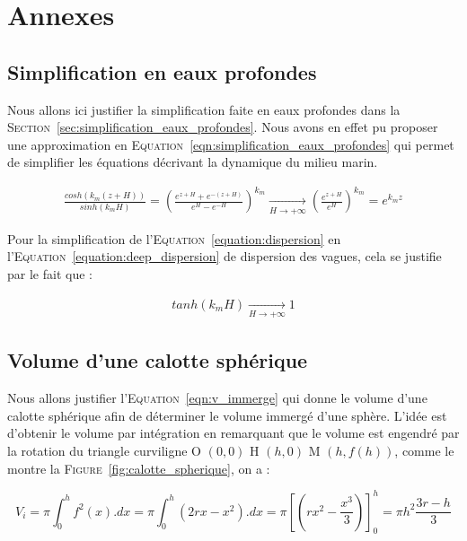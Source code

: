 \chapter{Annexes}
\label{annexe:gantt}

	\section{Simplification en eaux profondes}
	\label{annexe:deep_water}

		Nous allons ici justifier la simplification faite en eaux profondes dans la \textsc{Section}~\ref{sec:simplification_eaux_profondes}. Nous avons en effet pu proposer une approximation en \textsc{Equation}~\ref{eqn:simplification_eaux_profondes} qui permet de simplifier les équations décrivant la dynamique du milieu marin.

		\begin{eqnarray}
			\frac{cosh(k_m(z+H))}{sinh(k_mH)} = \left( \frac{e^{z+H} + e^{-(z+H)}}{e^{H}-e^{-H}} \right)^{k_m}  \xrightarrow[H \rightarrow + \infty]{}   \left( \frac{e^{z+H}}{e^{H}} \right)^{k_m} = e^{k_m z}
		\end{eqnarray}

		Pour la simplification de l'\textsc{Equation}~\ref{equation:dispersion} en l'\textsc{Equation}~\ref{equation:deep_dispersion} de dispersion des vagues, cela se justifie par le fait que :

		\begin{eqnarray}
			tanh(k_m H) \xrightarrow[H \rightarrow + \infty]{} 1
		\end{eqnarray}

	\section{Volume d'une calotte sphérique}
	\label{annexe:calotte_spherique}

		Nous allons justifier l'\textsc{Equation}~\ref{eqn:v_immerge} qui donne le volume d'une calotte sphérique afin de déterminer le volume immergé d'une sphère. L'idée est d'obtenir le volume par intégration en remarquant que le volume est engendré par la rotation du triangle curviligne O $(0, 0)$ H $(h, 0)$ M $(h, f(h))$, comme le montre la \textsc{Figure}~\ref{fig:calotte_spherique}, on a :

		\begin{equation}
			V_i = \pi \int_0^h f^2(x).dx = \pi \int_0^h (2rx - x^2).dx = \pi \left[(rx^2 - \frac{x^3}{3})\right]_0^h = \pi h^2 \frac{3r - h}{3}
		\end{equation}

